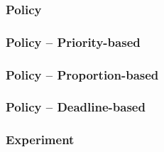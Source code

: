\documentclass{beamer}
\begin{document}
\begin{frame}
  \frametitle{Policy}
\end{frame}
\begin{frame}
  \frametitle{Policy -- Priority-based}
\end{frame}
\begin{frame}
  \frametitle{Policy -- Proportion-based}
\end{frame}
\begin{frame}
  \frametitle{Policy -- Deadline-based}
\end{frame}
\begin{frame}
  \frametitle{Experiment}
\end{frame}
\end{document}
